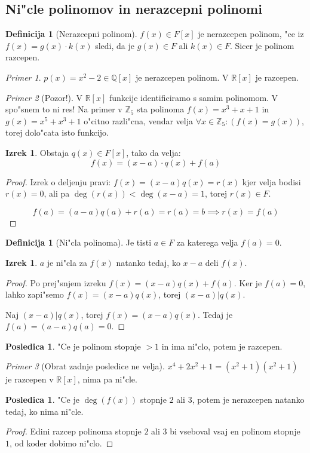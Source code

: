 \documentclass[11pt, a4paper]{article}
\theoremstyle{definition}
\newtheorem{defn}[counter]{Definicija}
\newtheorem{conseq}[counter]{Posledica}
\newtheorem{theorem}[counter]{Izrek}
\theoremstyle{remark}
\newtheorem*{ex}{Primer}
\newcommand{\Z}{\mathbb{Z}}
\newcommand{\Q}{\mathbb{Q}}
\newcommand{\R}{\mathbb{R}}
\begin{document}
	\subsection{Ni"cle polinomov in nerazcepni polinomi}
	\begin{defn}[Nerazcepni polinom]
		$f(x) \in F[x]$ je nerazcepen polinom, "ce iz $f(x) = g(x) \cdot k(x)$ sledi, da je $g(x) \in F$ ali $k(x) \in F$. Sicer je polinom razcepen.
	\end{defn}
	\begin{ex}
		$p(x) = x^2 - 2 \in \Q[x]$ je nerazcepen polinom. V $\R[x]$ je razcepen.
	\end{ex}

	\begin{ex}[Pozor!]
		V $\R[x]$ funkcije identificiramo s samim polinomom. V spo"snem to ni res! Na primer v $\Z_5$ sta polinoma $f(x) = x^3 + x + 1$ in $g(x) = x^5 + x^3 + 1$ o"citno razli"cna, vendar velja $\forall x \in \Z_5: (f(x) = g(x))$, torej dolo"cata isto funkcijo.
	\end{ex}

	\begin{theorem}
		Obstaja $q(x) \in F[x]$, tako da velja:
		\[ f(x) = (x-a) \cdot q(x) + f(a) \]
	\end{theorem}
	\begin{proof}
		Izrek o deljenju pravi: $f(x) = (x-a)q(x) = r(x)$ kjer velja bodisi $r(x) = 0$, ali pa $\deg(r(x)) < \deg(x-a) = 1$, torej $r(x) \in F$.
		
		\[ f(a) = (a-a)q(a) + r(a) = r(a) = b \implies r(x) = f(a) \]
	\end{proof}

	\begin{defn}[Ni"cla polinoma]
		Je tisti $a \in F$ za katerega velja $f(a) = 0$.
	\end{defn}
	\begin{theorem}
		$a$ je ni"cla za $f(x)$ natanko tedaj, ko $x-a$ deli $f(x)$.
	\end{theorem}
	\begin{proof}
		Po prej"snjem izreku $f(x) = (x-a)q(x) + f(a)$. Ker je $f(a) = 0$, lahko zapi"semo $f(x) = (x-a)q(x)$, torej $(x-a) | q(x)$.
		
		Naj $(x-a) | q(x)$, torej $f(x) = (x-a)q(x)$. Tedaj je $f(a) = (a-a)q(a) = 0$.
	\end{proof}
	\begin{conseq}
		"Ce je polinom stopnje $> 1$ in ima ni"clo, potem je razcepen.
	\end{conseq}
	\begin{ex}[Obrat zadnje posledice ne velja]
		$x^4+2x^2+1 = (x^2+1)(x^2+1)$ je razcepen v $\R[x]$, nima pa ni"cle.
	\end{ex}
	\begin{conseq}
		"Ce je $\deg(f(x))$ stopnje $2$ ali $3$, potem je nerazcepen natanko tedaj, ko nima ni"cle.
	\end{conseq}
	\begin{proof}
		Edini razcep polinoma stopnje $2$ ali $3$ bi vseboval vsaj en polinom stopnje $1$, od koder dobimo ni"clo.
	\end{proof}
\end{document}
